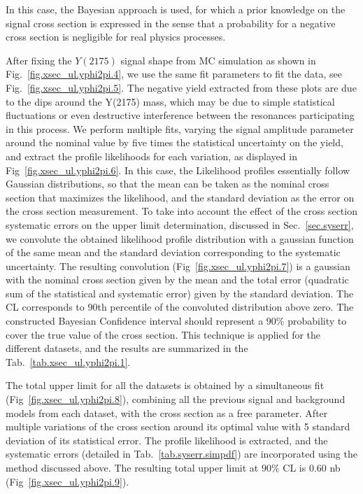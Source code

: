 \noindent In this case, the Bayesian approach is used, for which a prior knowledge on the signal cross section is expressed in the sense that a probability for a negative cross section is negligible for real physics processes.
~\par After fixing the $Y(2175)$ signal shape from MC simulation as shown in Fig.~\ref{fig.xsec_ul.yphi2pi.4}, we use the same fit parameters to fit the data, see Fig.~\ref{fig.xsec_ul.yphi2pi.5}. The negative yield extracted from these plots are due to the dips around the Y(2175) mass, which may be due to simple statistical fluctuations or even destructive interference between the resonances participating in this process. We perform multiple fits, varying the signal amplitude parameter around the nominal value by five times the statistical uncertainty on the yield, and extract the profile likelihoods for each variation, as displayed in Fig~\ref{fig.xsec_ul.yphi2pi.6}. In this case, the Likelihood profiles essentially follow Gaussian distributions, so that the mean can be taken as the nominal cross section that maximizes the likelihood, and the standard deviation as the error on the cross section measurement. To take into account the effect of the cross section systematic errors on the upper limit determination, discussed in Sec.~\ref{sec.syserr}, we convolute the obtained likelihood profile distribution with a gaussian function of the same mean and the standard deviation corresponding to the systematic uncertainty. The resulting convolution (Fig~\ref{fig.xsec_ul.yphi2pi.7}) is a gaussian with the nominal cross section given by the mean and the total error (quadratic sum of the statistical and systematic error) given by the standard deviation. The CL corresponds to 90th percentile of the convoluted distribution above zero. The constructed Bayesian Confidence interval should represent a $90\%$ probability to cover the true value of the cross section. This technique is applied for the different datasets, and the results are summarized in the Tab.~\ref{tab.xsec_ul.yphi2pi.1}.
~\par The total upper limit for all the datasets is obtained by a simultaneous fit (Fig~\ref{fig.xsec_ul.yphi2pi.8}), combining all the previous signal and background models from each dataset, with the cross section as a free parameter. After multiple variations of the cross section around its optimal value with 5 standard deviation of its statistical error. The profile likelihood is extracted, and the systematic errors (detailed in Tab.~\ref{tab.syserr.simpdf}) are incorporated using the method discussed above. The resulting total upper limit at $90\%$ CL is 0.60 nb (Fig~\ref{fig.xsec_ul.yphi2pi.9}).

